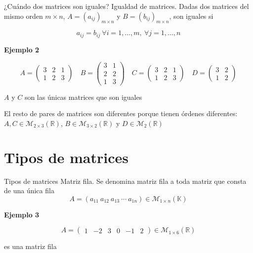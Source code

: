 \documentclass[
  ignorenonframetext,
]{beamer}
\begin{document}
\begin{frame}{¿Cuándo dos matrices son iguales?}
\protect\hypertarget{cuuxe1ndo-dos-matrices-son-iguales}{}
Igualdad de matrices. Dadas dos matrices del mismo orden \(m\times n\),
\(A = (a_{ij})_{m\times n}\) y \(B = (b_{ij})_{m\times n}\), son iguales
si

\[a_{ij} = b_{ij}\ \forall i = 1,\dots,m,\ \forall j=1,\dots,n\]

\textbf{Ejemplo 2}

\[A = \begin{pmatrix}3 & 2 & 1\\ 1& 2& 3\end{pmatrix}\quad B=\begin{pmatrix}3 & 1\\ 2 & 2\\ 1 &3\end{pmatrix}\quad C = \begin{pmatrix}3 & 2 & 1\\ 1& 2& 3\end{pmatrix}\quad D = \begin{pmatrix}3 & 2\\ 1& 2\end{pmatrix}\]

\(A\) y \(C\) son las únicas matrices que son iguales

El resto de pares de matrices son diferentes porque tienen órdenes
diferentes: \(A,C\in\mathcal{M}_{2\times 3}(\mathbb{R})\),
\(B\in\mathcal{M}_{3\times 2}(\mathbb{R})\) y
\(D\in\mathcal{M}_{2}(\mathbb{R})\)
\end{frame}

\hypertarget{tipos-de-matrices}{%
\section{Tipos de matrices}\label{tipos-de-matrices}}

\begin{frame}{Tipos de matrices}
\protect\hypertarget{tipos-de-matrices-1}{}
Matriz fila. Se denomina matriz fila a toda matriz que consta de una
única fila
\[A = (a_{11} \ a_{12}\ a_{13}\ \cdots \ a_{1n})\in\mathcal{M}_{1\times n}(\mathbb{K})\]

\textbf{Ejemplo 3}

\[A =\begin{pmatrix}1&-2&3&0&-1&2\end{pmatrix}\in\mathcal{M}_{1\times 6}(\mathbb{R})\]

es una matriz fila
\end{frame}
\end{document}
